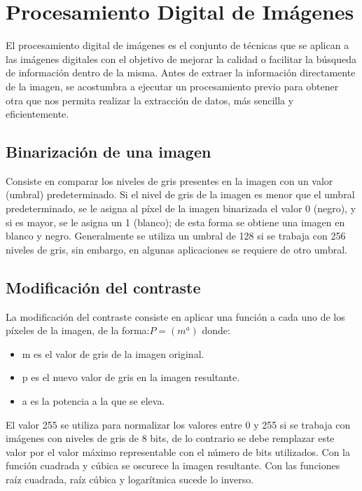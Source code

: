 \section{Procesamiento Digital de Imágenes}
El procesamiento digital de imágenes es el conjunto de técnicas que se aplican a las imágenes digitales con el objetivo de mejorar la calidad o facilitar la búsqueda de información dentro de la misma. Antes de extraer la información directamente de la imagen, se acostumbra a ejecutar un procesamiento previo para obtener otra que nos permita realizar la extracción de datos, más sencilla y eficientemente.

\subsection{Binarización de una imagen}
Consiste en comparar los niveles de gris presentes en la imagen con un valor (umbral) predeterminado. Si el nivel de gris de la imagen es menor que el umbral predeterminado, se le asigna al píxel de la imagen binarizada el valor 0 (negro), y si es mayor, se le asigna un 1 (blanco); de esta forma se obtiene una imagen en blanco y negro. Generalmente se utiliza un umbral de 128 si se trabaja con 256 niveles de gris, sin embargo, en algunas aplicaciones se requiere de otro umbral.

\subsection{Modificación del contraste}
La modificación del contraste consiste en aplicar una función a cada uno de los
píxeles de la imagen, de la forma:$P=(m^{a})$ donde:\\
	
	\begin{itemize}
		\item m es el valor de gris de la imagen original.
		\item p es el nuevo valor de gris en la imagen resultante.
		\item a es la potencia a la que se eleva.
	\end{itemize}
El valor 255 se utiliza para normalizar los valores entre 0 y 255 si se trabaja con imágenes con niveles de gris de 8 bits, de lo contrario se debe remplazar este valor por el valor máximo representable con el número de bits utilizados. Con la función cuadrada y cúbica se oscurece la imagen resultante. Con las funciones raíz cuadrada, raíz cúbica y logarítmica sucede lo inverso.

